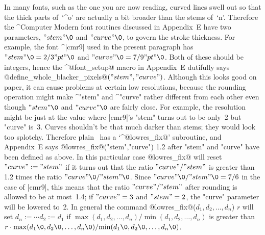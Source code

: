 \ddanger In many fonts, such as the one you are now reading,
curved lines swell out so that the thick parts of~`^{o}' are actually
a bit broader than the stems of~`n'. Therefore the ^{Computer Modern}
font routines discussed in Appendix~E have two parameters,
$"stem"\0$ and $"curve"\0$, to govern the stroke thickness.
For example, the font ^|cmr9| used in the present paragraph has
$"stem"\0=2/3"pt"\0$ and $"curve"\0=7/9"pt"\0$. Both of these should
be integers, hence the ^@font\_setup@ macro in Appendix~E
dutifully says
\begindisplay
@define\_whole\_blacker\_pixels@$("stem","curve")$.
\enddisplay
Although this looks good on paper, it can cause problems at certain
low resolutions, because the rounding operation might make ^"stem" and
^"curve" rather different from each other even though $"stem"\0$ and
$"curve"\0$ are fairly close. For example, the resolution might be
just at the value where |cmr9|'s "stem" turns out to be only~2
but "curve" is~3. Curves shouldn't be that much darker than stems;
they would look too splotchy. Therefore plain \MF\
has a `^@lowres\_fix@' subroutine, and Appendix~E says
\begindisplay
@lowres\_fix@("stem","curve") 1.2
\enddisplay
after "stem" and "curve" have been defined as above. In this particular
case @lowres\_fix@ will reset $"curve":="stem"$ if it turns out that the
ratio $"curve"/"stem"$ is greater than 1.2 times the ratio
$"curve"\0/"stem"\0$. Since $"curve"\0/"stem"\0=7/6$ in the case of |cmr9|,
this means that the ratio $"curve"/"stem"$ after rounding is allowed
to be at most~1.4; if $"curve"=3$ and $"stem"=2$, the "curve" parameter
will be lowered to~2. In general the command
\begindisplay
@lowres\_fix@($d_1,d_2,\ldots,d_n$) $r$
\enddisplay
will set $d_n:=\cdots d_2:=d_1$ if $\max(d_1,d_2,\ldots,d_n)/\!
\min(d_1,d_2,\ldots,d_n)$ is greater than
$r\cdot\max(d_1\0,d_2\0,\ldots,d_n\0)/\!\min(d_1\0,d_2\0,\ldots,d_n\0)$.

